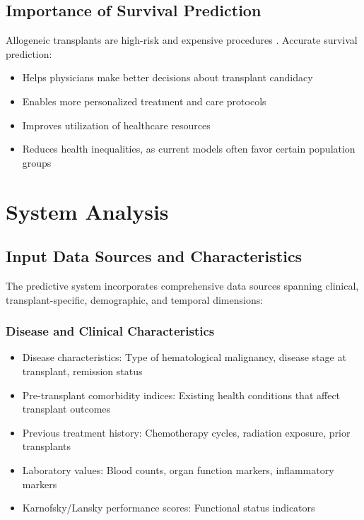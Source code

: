 \subsection{Importance of Survival Prediction}

Allogeneic transplants are high-risk and expensive procedures \cite{astct_simplification}. Accurate survival prediction:
\begin{itemize}
    \item Helps physicians make better decisions about transplant candidacy
    \item Enables more personalized treatment and care protocols
    \item Improves utilization of healthcare resources
    \item Reduces health inequalities, as current models often favor certain population groups \cite{jama_ai_medicine}
\end{itemize}

\section{System Analysis}

\subsection{Input Data Sources and Characteristics}

The predictive system incorporates comprehensive data sources spanning clinical, transplant-specific, demographic, and temporal dimensions:

\subsubsection{Disease and Clinical Characteristics}
\begin{itemize}
    \item Disease characteristics: Type of hematological malignancy, disease stage at transplant, remission status
    \item Pre-transplant comorbidity indices: Existing health conditions that affect transplant outcomes
    \item Previous treatment history: Chemotherapy cycles, radiation exposure, prior transplants
    \item Laboratory values: Blood counts, organ function markers, inflammatory markers
    \item Karnofsky/Lansky performance scores: Functional status indicators
\end{itemize}

